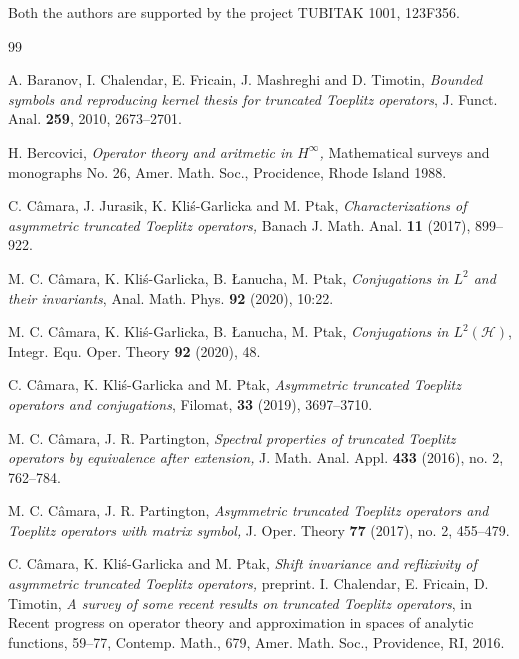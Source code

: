 \documentclass[12pt]{amsart}
\numberwithin{equation}{section}
\theoremstyle{definition}
\numberwithin{equation}{section}
\begin{document}
\noindent Both the authors are supported by the project TUBITAK 1001, 123F356.






\begin{thebibliography}{99}
	
	{A. Baranov, I. Chalendar, E. Fricain, J. Mashreghi and D. Timotin},
	\textit{Bounded symbols and reproducing kernel thesis for truncated Toeplitz operators},
	J. Funct. Anal. {\bf 259}, 2010, 2673--2701.
	
	
{H. Bercovici},
\textit{Operator theory and aritmetic in $H^\infty$,} Mathematical surveys and monographs No. 26, Amer. Math. Soc., Procidence, Rhode Island 1988.
	
	
	
	
	{C. C\^{a}mara, J. Jurasik, K. Kli\'s-Garlicka and M. Ptak}, \textit{Characterizations of asymmetric truncated Toeplitz operators,} Banach J. Math. Anal. {\bf 11} (2017), 899--922.

	M. C. C\^amara, K. Kli\'{s}-Garlicka, B. \L anucha, M. Ptak,  \emph{Conjugations in $L^2$ and their invariants},  Anal. Math. Phys. \textbf{92} (2020), 10:22.
	



	M. C. C\^amara, K. Kli\'{s}-Garlicka, B. \L anucha, M. Ptak,  \emph{Conjugations in $L^2(\mathcal {H})$}, Integr. Equ. Oper. Theory \textbf{92} (2020), 48.
	
	{C. C\^{a}mara, K. Kli\'s-Garlicka and M. Ptak},
	\textit{Asymmetric truncated Toeplitz operators and conjugations},
	Filomat, {\bf 33} (2019), 3697--3710.
	
	


M. C. C\^{a}mara, J. R. Partington, \emph{Spectral properties of truncated Toeplitz operators by equivalence after extension,} J. Math. Anal. Appl. \textbf{433} (2016), no. 2, 762--784.

M. C. C\^{a}mara, J. R. Partington, \emph{Asymmetric truncated Toeplitz operators and Toeplitz operators with matrix symbol,} J. Oper. Theory \textbf{77} (2017), no. 2, 455--479.

C. C\^{a}mara, K. Kli\'s-Garlicka and M. Ptak, \emph{Shift invariance and reflixivity of asymmetric truncated Toeplitz operators,} preprint.
I. Chalendar, E. Fricain, D. Timotin, \textit{A survey of some recent results on truncated Toeplitz operators}, in Recent progress on operator theory and approximation in spaces
			of analytic functions, 59--77, Contemp. Math., 679, Amer. Math. Soc., Providence, RI, 2016.



\end{thebibliography}
\end{document}
